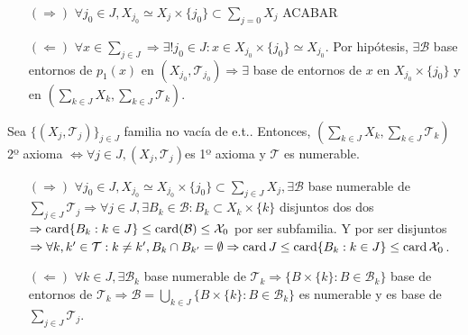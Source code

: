 \begin{dem}
  \begin{enumerate}[label=(\roman*)]
    \item []
    \item [$(\Rightarrow)$] $\forall j_{0} \in J, X_{j_{0}} \simeq X_{j} \times \{ j_{0} \} \subset \sum_{j = 0}^{} X_{j}$ ACABAR
    \item [$(\Leftarrow)$] $\forall x \in \sum_{j \in J} \Rightarrow \exists ! j_{0} \in J :  x \in X_{j_{0}} \times \{  j_{0} \} \simeq X_{j_{0}}$. Por hipótesis, $\exists \mathcal{B}$ base entornos de $p_{1}(x)$ en $( X_{j_{0}}, \mathcal{T}_{j_{0}} ) \Rightarrow \exists$ base de entornos de $x$ en $X_{j_{0}} \times \{ j_{0} \}$ y en $( \sum_{k \in J} X_{k}, \sum_{k \in J} \mathcal{T}_{k})$.
  \end{enumerate}
\end{dem}

\begin{prop}
  Sea $\{ ( X_{j}, \mathcal{T}_{j} ) \}_{j \in J}$ familia no vacía de e.t.. Entonces, $( \sum_{k \in J} X_{k}, \sum_{k \in J} \mathcal{T}_{k})$ 2º axioma $\Leftrightarrow \forall j \in J, ( X_{j}, \mathcal{T}_{j} )$es 1º axioma y $\mathcal{T}$ es numerable.
\end{prop}

\begin{dem}
  \begin{enumerate}[label=(\roman*)]
    \item []
    \item [$(\Rightarrow)$] $\forall j_{0} \in J, X_{j_{0}} \simeq X_{j_{0}} \times \{ j_{0} \} \subset \sum_{j \in J} X_{j}, \exists \mathcal{B}$ base numerable de $\sum_{j \in J} \mathcal{T}_{j} \Rightarrow \forall j \in J, \exists B_{k} \in \mathcal{B} : B_{k} \subset X_{k} \times \{ k \}$ disjuntos dos dos $\Rightarrow \operatorname{card} \{ B_{k} : k \in J \} \leq \operatorname{card}(\mathcal{B}) \leq \mathcal{X}_{0}$ por ser subfamilia. Y por ser disjuntos $\Rightarrow \forall k, k' \in \mathcal{T} : k \neq k', B_{k} \cap B_{k'} = \emptyset \Rightarrow \operatorname{card} J \leq \operatorname{card} \{  B_{k} : k \in J \} \leq \operatorname{card} \mathcal{X}_{0}$.
    \item [$(\Leftarrow)$] $\forall k \in J, \exists \mathcal{B}_{k}$ base numerable de $\mathcal{T}_{k} \Rightarrow \{  B \times \{ k \} : B \in \mathcal{B}_{k} \}$ base de entornos de $\mathcal{T}_{k} \Rightarrow \mathcal{B} = \bigcup_{k \in J} \{ B \times \{ k \}: B \in \mathcal{B}_{k} \}$ es numerable y es base de $\sum_{j \in J} \mathcal{T}_{j}$.
  \end{enumerate}
\end{dem}


